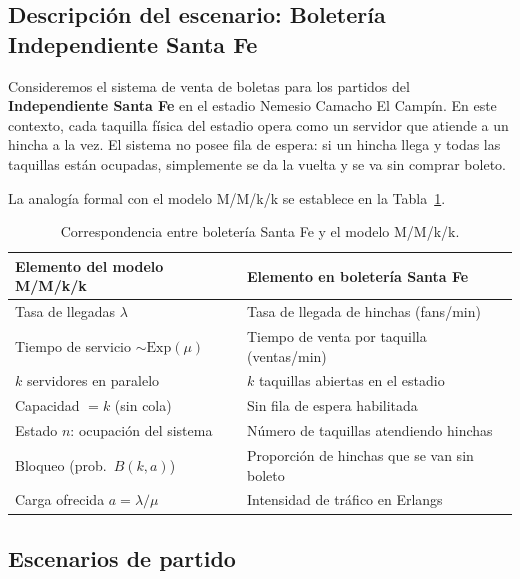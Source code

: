 
\subsection{Descripción del escenario: Boletería Independiente Santa Fe}

Consideremos el sistema de venta de boletas para los partidos del
\textbf{Independiente Santa Fe} en el estadio Nemesio Camacho El Campín.
En este contexto, cada taquilla física del estadio opera como un servidor
que atiende a un hincha a la vez. El sistema no posee fila de espera:
si un hincha llega y todas las taquillas están ocupadas, simplemente
se da la vuelta y se va sin comprar boleto.

La analogía formal con el modelo M/M/k/k se establece en la
Tabla~\ref{tab:analogia_santafe}.

\begin{table}[H]
\centering
\caption{Correspondencia entre boletería Santa Fe y el modelo M/M/k/k.}
\label{tab:analogia_santafe}
\begin{tabular}{ll}
\toprule
\textbf{Elemento del modelo M/M/k/k} & \textbf{Elemento en boletería Santa Fe} \\
\midrule
Tasa de llegadas $\lambda$ & Tasa de llegada de hinchas (fans/min) \\
Tiempo de servicio $\sim \mathrm{Exp}(\mu)$ & Tiempo de venta por taquilla (ventas/min) \\
$k$ servidores en paralelo & $k$ taquillas abiertas en el estadio \\
Capacidad $=k$ (sin cola) & Sin fila de espera habilitada \\
Estado $n$: ocupación del sistema & Número de taquillas atendiendo hinchas \\
Bloqueo (prob.\ $B(k,a)$) & Proporción de hinchas que se van sin boleto \\
Carga ofrecida $a=\lambda/\mu$ & Intensidad de tráfico en Erlangs \\
\bottomrule
\end{tabular}
\end{table}

\subsection{Escenarios de partido}

